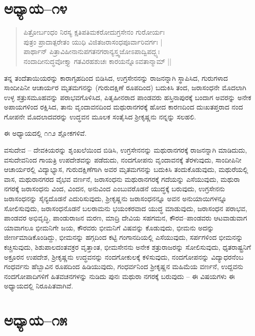 \section{ಅಧ್ಯಾಯ–೧೪}

\begin{verse}
ಪಿತ್ರೋರ್ಬಂಧಂ ನಿರಸ್ಯ ಕ್ಷತಿಪತಿಮಕರೋದುಗ್ರಸೇನಂ ಗುರೋರ್ಯಃ\\ ಪುತ್ರಂ ಪ್ರಾದಾತ್ಪರೇತಂ ಯುಧಿ ವಿಜಿತಜರಾಸಂಧಪೂರ್ವಾರಿವರ್ಗಃ |\\ ಪಾರ್ಥಾನ್ ಪಿತ್ರಾವಿಹೀನಾನುಪಗತನಗರಾನ್ಯಸ್ತ್ವಜೋಽಪಾದ್ವಿಪದ್ಭ್ಯಃ\\ ನಂದಾದೀನುದ್ಧವೋಕ್ತ್ಯಾ ಗತವಿರಹಶುಚಃ ಕಾರಯನ್ನೊಽವತಾನ್ಮಾಮ್ ||
\end{verse}

ತನ್ನ ತಂದೆತಾಯಿಯರನ್ನು ಕಾರಾಗೃಹದಿಂದ ಬಿಡಿಸಿದ, ಉಗ್ರಸೇನನನ್ನು ರಾಜನನ್ನಾಗಿ ಸ್ಥಾಪಿಸಿದ, ಗುರುಗಳಾದ ಸಾಂದೀಪಿನೀ ಆಚಾರ್ಯರ ಮೃತಮಗನನ್ನು (ಗುರುದಕ್ಷಿಣೆ ರೂಪದಿಂದ) ಬದುಕಿಸಿ ತಂದ, ಜರಾಸಂಧನೇ ಮೊದಲಾಗಿ ಉಳ್ಳ ಶತ್ರುಸಮೂಹವನ್ನು ಪರಾಭವಗೊಳಿಸಿದ, ಪಿತೃಹೀನರಾದ ಪಾಂಡವರು ಹಸ್ತಿನಾಪುರಕ್ಕೆ ಬಂದಾಗ ಅವರನ್ನು ಅನೇಕ ಅಪಾಯಗಳಿಂದ ರಕ್ಷಿಸಿದ, ತಾನು ವೃಂದಾವನದಿಂದ ಮಥುರಾನಗರಕ್ಕೆ ಹೋದ ಕಾರಣದಿಂದ ದುಃಖತಪ್ತರಾದ ನಂದ ಗೋಪನೇ ಮೊದಲಾದವರನ್ನು ಉದ್ಧವನ ಮೂಲಕ ಸಂತೈಸಿದ ಶ‍್ರೀಕೃಷ್ಣನು ನನ್ನನ್ನು ಸಲಹಲಿ.

ಈ ಅಧ್ಯಾಯದಲ್ಲಿ ೧೧೨ ಶ್ಲೋಕಗಳಿವೆ.

ವಸುದೇವ – ದೇವಕಿಯರನ್ನು ಶೃಂಖಲೆಯಿಂದ ಬಿಡಿಸಿ, ಉಗ್ರಸೇನನನ್ನು ಮಥುರಾನಗರಕ್ಕೆ ರಾಜನನ್ನಾಗಿ ಮಾಡಿದುದು, ವಸುದೇವನಿಂದ ಗಾಯತ್ರಿ ಉಪದೇಶವನ್ನು ಪಡೆದುದು, ನಂದಗೋಪನು ವೃಂದಾವನಕ್ಕೆ ತೆರಳುವುದು, ಸಾಂದೀಪಿನೀ ಆಚಾರ್ಯರಲ್ಲಿ ವಿದ್ಯಾಭ್ಯಾಸ, ಗುರುದಕ್ಷಿಣೆಗಾಗಿ ಅವರ ಮೃತಮಗನನ್ನು ಬದುಕಿಸಿ ತಂದುಕೊಡುವುದು, ಮಥುರೆಯಲ್ಲಿ ವಾಸ, ಮಥುರಾನಗರದ ವೈಭವ ವರ್ಣನೆ, ಜರಾಸಂಧನು ಮಥುರಾನಗರಕ್ಕೆ ಗದೆಯನ್ನು ಎಸೆಯುವುದು, ಮಥುರಾ ನಗರಕ್ಕೆ ಜರಾಸಂಧನು ವಿಂದ, ವಿಂದನ, ಅನುವಿಂದ ಎಂಬುವರೊಡನೆ ಯುದ್ಧಕ್ಕೆ ಬರುವುದು, ಉಗ್ರಸೇನನು ಜರಾಸಂಧನನ್ನು ಸೈನ್ಯದೊಡನೆ ಎದುರಿಸುವುದು, ಶ‍್ರೀಕೃಷ್ಣನು ಜರಾಸಂಧನನ್ನೂ ಅವನ ಅನುಯಾಯಿಗಳನ್ನೂ ಸೋಲಿಸುವುದು, ಜರಾಸಂಧನೊಡನೆ ಬಲರಾಮನು ಭಯಂಕರವಾದ ಯುದ್ಧ ಮಾಡುವುದು, ಜರಾಸಂಧನ ಪರಾಭವ, ಪಾಂಡವರ ಅಭಿವೃದ್ಧಿ, ಪಾಂಡುರಾಜನ ಮರಣ, ಮಾದ್ರಿ ದೇವಿಯ ಸಹಗಮನ, ಕೌರವ–ಪಾಂಡವರು ಆಟವಾಡುವಾಗ ಯಾವಾಗಲೂ ಭೀಮನಿಗೇ ಜಯ, ಕೌರವರು ಭೀಮನಿಗೆ ವಿಷವನ್ನು ಕೊಡುವುದು, ಭೀಮನು ಅದನ್ನು ಜೀರ್ಣಮಾಡಿಕೊಂಡಿದ್ದು, ಭೀಮನನ್ನು ಹಗ್ಗದಿಂದ ಕಟ್ಟಿ ಗಂಗಾನದಿಯಲ್ಲಿ ಎಸೆಯುವುದು, ಸರ್ಪಗಳಿಂದ ಭೀಮನನ್ನು ಕಚ್ಚಿಸುವುದು, ಶಿಶುಪಾಲದಂತವಕ್ರರ ವೃತ್ತಾಂತ, ಭೀಮಸೇನನು ಅನೇಕ ಶತ್ರುರಾಜರನ್ನು ಸೋಲಿಸುವುದು, ಧೃತರಾಷ್ಟ್ರನಿಗೆ ಅಕ್ರೂರನ ಉಪದೇಶ, ಶ‍್ರೀಕೃಷ್ಣನು ಉದ್ಧವನನ್ನು ನಂದಗೋಕುಲಕ್ಕೆ ಕಳಿಸುವುದು, ನಂದಗೋಪನನ್ನು ವಿದ್ಯಾಧರನೆಂಬ ಗಂಧರ್ವನು ಹೆಬ್ಬಾವಿನ ರೂಪದಿಂದ ಹಿಡಿಯುವುದು, ಗಂಧರ್ವನಿಂದ ಶ‍್ರೀಕೃಷ್ಣನ ಮಹಿಮೆಯ ವರ್ಣನೆ, ಉದ್ದವನು ನಂದಗೋಪಾದಿಗಳಿಗೆ ಹಿತವಚನಗಳನ್ನು ನುಡಿದು ಪುನಃ ಮಥುರಾ ನಗರಕ್ಕೆ ಬರುವುದು – ಈ ವಿಷಯಗಳು ಈ ಅಧ್ಯಾಯದಲ್ಲಿ ನಿರೂಪಿತವಾಗಿವೆ.


\section{ಅಧ್ಯಾಯ–೧೫}

